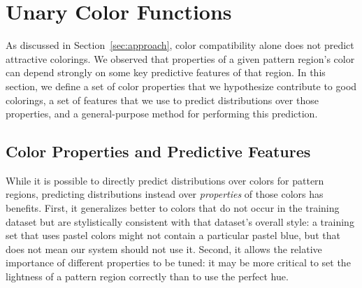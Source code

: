 \section{Unary Color Functions}
\label{sec:unary}

As discussed in Section~\ref{sec:approach}, color compatibility alone does not predict attractive colorings. We observed that properties of a given pattern region's color can depend strongly on some key predictive features of that region. In this section, we define a set of color properties that we hypothesize contribute to good colorings, a set of features that we use to predict distributions over those properties, and a general-purpose method for performing this prediction.

\subsection{Color Properties and Predictive Features}
\label{sec:unaryPropsAndFeatures}

While it is possible to directly predict distributions over colors for pattern regions, predicting distributions instead over \emph{properties} of those colors has benefits. First, it generalizes better to colors that do not occur in the training dataset but are stylistically consistent with that dataset's overall style: a training set that uses pastel colors might not contain a particular pastel blue, but that does not mean our system should not use it. Second, it allows the relative importance of different properties to be tuned: it may be more critical to set the lightness of a pattern region correctly than to use the perfect hue.

